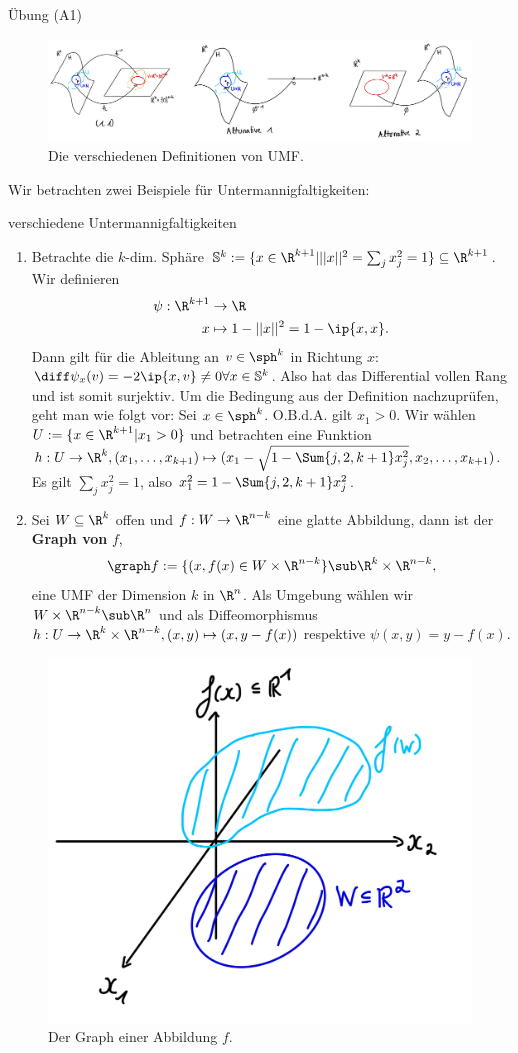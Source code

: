 \begin{beweis}
Übung (A1)
\end{beweis}
\begin{figure}[h!]
\label{fig:umfn}
\centering
\includegraphics[width=0.9\linewidth]{Bilder/umf_def.png}
\caption{Die verschiedenen Definitionen von UMF.}
\end{figure}
Wir betrachten zwei Beispiele für Untermannigfaltigkeiten:
\begin{beispiele}{verschiedene Untermannigfaltigkeiten}
\begin{enumerate}
\item Betrachte die $k$-dim. Sphäre $\mathbb{S}^k := \{x \in \R^{k+1} | ||x||^2 = \sum_j x_j^2 = 1 \} \subseteq \R^{k+1}$. Wir definieren
\begin{align}
\psi: \R^{k+1} &\to \R \\
x &\mapsto 1-||x||^2 = 1 - \ip{x, x}.
\end{align}
Dann gilt für die Ableitung an $v \in \sph^k$ in Richtung $x$: $\diff \psi_x (v) = -2 \ip{x, v} \neq 0 \forall x \in \mathbb{S}^k$. Also hat das Differential vollen Rang und ist somit surjektiv. Um die Bedingung aus der Definition nachzuprüfen, geht man wie folgt vor: Sei $x \in \sph^k$. O.B.d.A. gilt $x_1 > 0$. Wir wählen $U := \{ x \in \R^{k+1} | x_1 > 0 \}$ und betrachten eine Funktion $h: U \to \R^k, (x_1, \dots, x_{k+1}) \mapsto (x_1 - \sqrt{1-\Sum{j, 2, k+1} x_j^2}, x_2, \dots, x_{k+1})$. Es gilt $\sum_j x_j^2 =1$, also $x_1^2 = 1-\Sum{j,2,k+1} x_j^2$. 
\item Sei $W \subseteq \R^k$ offen und $f: W \to \R^{n-k}$ eine glatte Abbildung, dann ist der \textbf{Graph von} $f$,
\begin{equation}
\graph f:= \{ (x, f(x) \in W \times \R^{n-k} \} \sub \R^k \times \R^{n-k},
\end{equation}
eine UMF der Dimension $k$ in $\R^n$.
Als Umgebung wählen wir $W \times \R^{n-k} \sub \R^n$ und als Diffeomorphismus $h: U \to \R^k \times \R^{n-k}, (x, y) \mapsto (x, y-f(x))$ respektive $\psi(x,y)=y-f(x)$.
\end{enumerate}
\begin{figure}[H]
\label{fig:graph}
\centering
\includegraphics[width=0.2\linewidth]{Bilder/graph.png}
\caption{Der Graph einer Abbildung $f$.}
\end{figure}
\end{beispiele}
